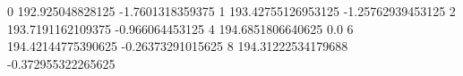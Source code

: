 0 192.925048828125 -1.7601318359375
1 193.42755126953125 -1.25762939453125
2 193.7191162109375 -0.966064453125
4 194.6851806640625 0.0
6 194.42144775390625 -0.26373291015625
8 194.31222534179688 -0.372955322265625
